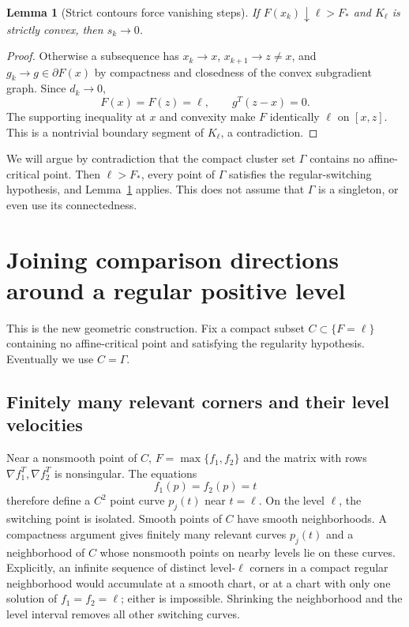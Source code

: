 \documentclass[10pt,oneside,openany]{book}
\newtheorem{lemma}{Lemma}[chapter]
\theoremstyle{remark}\newtheorem{remark}{Remark}[chapter]
\begin{document}
\begin{lemma}[Strict contours force vanishing steps]\label{C:lem:steps}
If $F(x_k)\downarrow\ell>F_*$ and $K_\ell$ is strictly convex, then $s_k\to0$.
\end{lemma}
\begin{proof}
Otherwise a subsequence has $x_k\to x$, $x_{k+1}\to z\ne x$, and $g_k\to g\in\partial F(x)$ by compactness and closedness of the convex subgradient graph. Since $d_k\to0$,
\[
 F(x)=F(z)=\ell,\qquad g^T(z-x)=0.
\]
The supporting inequality at $x$ and convexity make $F$ identically $\ell$ on $[x,z]$. This is a nontrivial boundary segment of $K_\ell$, a contradiction.
\end{proof}

We will argue by contradiction that the compact cluster set $\Gamma$ contains no affine-critical point. Then $\ell>F_*$, every point of $\Gamma$ satisfies the regular-switching hypothesis, and Lemma~\ref{C:lem:steps} applies. This does not assume that $\Gamma$ is a singleton, or even use its connectedness.


\setcounter{section}{3}
\setcounter{theorem}{4}
\setcounter{equation}{5}
\section{Joining comparison directions around a regular positive level}
This is the new geometric construction. Fix a compact subset $C\subset\{F=\ell\}$ containing no affine-critical point and satisfying the regularity hypothesis. Eventually we use $C=\Gamma$.

\subsection{Finitely many relevant corners and their level velocities}
Near a nonsmooth point of $C$, $F=\max\{f_1,f_2\}$ and the matrix with rows $\nabla f_1^T,\nabla f_2^T$ is nonsingular. The equations
\[
 f_1(p)=f_2(p)=t
\]
therefore define a $C^2$ point curve $p_j(t)$ near $t=\ell$. On the level $\ell$, the switching point is isolated. Smooth points of $C$ have smooth neighborhoods. A compactness argument gives finitely many relevant curves $p_j(t)$ and a neighborhood of $C$ whose nonsmooth points on nearby levels lie on these curves. Explicitly, an infinite sequence of distinct level-$\ell$ corners in a compact regular neighborhood would accumulate at a smooth chart, or at a chart with only one solution of $f_1=f_2=\ell$; either is impossible. Shrinking the neighborhood and the level interval removes all other switching curves.
\end{document}
